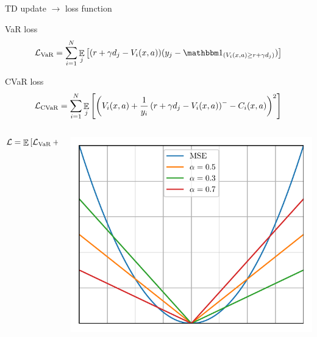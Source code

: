 \documentclass{beamer}
\begin{document}

%


\begin{frame}{TD update $\to$ loss function}
\begin{block}{VaR loss}
$$\mathcal{L}_{\var}=\sum_{i=1}^{N} \expect_j\bsquare{(r + \gamma d_j - V_i(x, a))(y_j - \indicator_{(V_i(x, a) \ge r + \gamma d_j)})}$$
\end{block}

\begin{block}{CVaR loss}
\vspace{-0.5cm}
$$
\mathcal{L}_{\text{CVaR}}=\sum_{i=1}^{N} \mathop{\mathbb{E}}_j\left[ {\left( {V_i(x, a) + \frac{1}{y_i} \left( {r + \gamma d_j - V_i(x, a)} \right)^- - C_i(x, a)} \right)^2} \right]
$$
\end{block}
\vspace{-0.3cm}

\begin{columns}
\begin{column}{0.5\textwidth}
$$\mathcal{L} = \mathop{\mathbb{E}}\left[\mathcal{L}_{\text{VaR}} + \mathcal{L}_{\text{CVaR}} \right]$$
\end{column}
\begin{column}{0.5\textwidth}
\center
\includegraphics[width=0.6\linewidth]{../gfx/losses.pdf}
\end{column}
\end{columns}

\end{frame}
\end{document}
